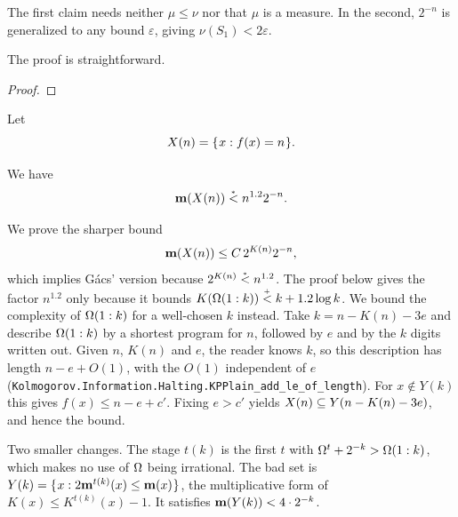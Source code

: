 \begin{formalization}
The first claim needs neither \( \mu \le \nu \) nor that \( \mu \) is a measure. In the
second, \( 2^{-n} \) is generalized to any bound \( \varepsilon \), giving
\( \nu(S_1) < 2\varepsilon \).
\end{formalization}

The proof is straightforward.

\begin{proof}
  \leanok
\end{proof}

Let
 \[
     X(n) = \mathopen\{\mskip 1mu x : f(x) = n\mskip 1mu\mathclose\}.
 \]

 \begin{lemma}\label{lem:co-co-rare}
  \leanok
 We have
 \[
  \mathbf{m}(X(n)) \stackrel{{}_*}{<} n^{1.2} 2^{-n}.
 \]
 \end{lemma}

\begin{formalization}
We prove the sharper bound
 \[
   \mathbf{m}(X(n)) \le C\, 2^{K(n)} 2^{-n},
 \]
which implies G\'acs' version because \( 2^{K(n)} \stackrel{{}_*}{<} n^{1.2} \). The proof below gives
the factor \( n^{1.2} \) only because it bounds
\( K(\Omega(1:k)) \stackrel{{}_+}{<} k + 1.2 \log k \). We bound the complexity of \( \Omega(1:k) \) for a
well-chosen \( k \) instead. Take \( k = n - K(n) - 3e \) and describe \( \Omega(1:k) \) by a
shortest program for \( n \), followed by \( e \) and by the \( k \) digits written out. Given
\( n \), \( K(n) \) and \( e \), the reader knows \( k \), so this description has length
\( n - e + O(1) \), with the \( O(1) \) independent of \( e \)
(\texttt{Kolmogorov.Information.Halting.KPPlain\_add\_le\_of\_length}). For \( x \notin Y(k) \)
this gives
\( f(x) \le n - e + c' \). Fixing \( e > c' \) yields
\( X(n) \subseteq Y(n - K(n) - 3e) \), and hence the bound.

Two smaller changes. The stage \( t(k) \) is the first \( t \) with
\( \Omega^{t} + 2^{-k} > \Omega(1:k) \), which makes no use of \( \Omega \) being irrational. The bad
set is \( Y(k) = \mathopen\{\mskip 1mu x : 2\mathbf{m}^{t(k)}(x) \le \mathbf{m}(x)\mskip 1mu\mathclose\} \), the multiplicative form of
\( K(x) \le K^{t(k)}(x) - 1 \). It satisfies \( \mathbf{m}(Y(k)) < 4 \cdot 2^{-k} \).
\end{formalization}

